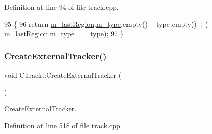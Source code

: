 Definition at line 94 of file track.\+cpp.


\begin{DoxyCode}
95 \{
96     \textcolor{keywordflow}{return} \mbox{\hyperlink{class_c_track_a5af91fbfad7ebf07bd0f681f915e440c}{m\_lastRegion}}.\mbox{\hyperlink{class_c_region_a287bf43ffa4837595762cbb007459a9a}{m\_type}}.empty() || type.empty() || (
      \mbox{\hyperlink{class_c_track_a5af91fbfad7ebf07bd0f681f915e440c}{m\_lastRegion}}.\mbox{\hyperlink{class_c_region_a287bf43ffa4837595762cbb007459a9a}{m\_type}} == type);
97 \}
\end{DoxyCode}
\mbox{\label{class_c_track_ab7ffab3c66234eeb542d0411abfa24e6}} 
\subsubsection{\texorpdfstring{Create\+External\+Tracker()}{CreateExternalTracker()}}
{\footnotesize\ttfamily void C\+Track\+::\+Create\+External\+Tracker (\begin{DoxyParamCaption}{ }\end{DoxyParamCaption})\hspace{0.3cm}{\ttfamily [private]}}



Create\+External\+Tracker. 



Definition at line 518 of file track.\+cpp.


